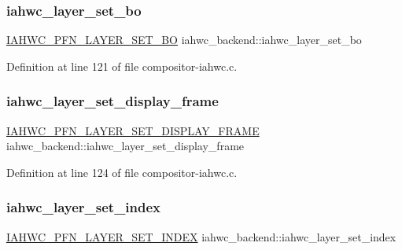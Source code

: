 \subsubsection{\texorpdfstring{iahwc\+\_\+layer\+\_\+set\+\_\+bo}{iahwc\_layer\_set\_bo}}
{\footnotesize\ttfamily \mbox{\hyperlink{iahwc_8h_a0b77b3ec5acd37ce148cf7e50edfc5cc}{I\+A\+H\+W\+C\+\_\+\+P\+F\+N\+\_\+\+L\+A\+Y\+E\+R\+\_\+\+S\+E\+T\+\_\+\+BO}} iahwc\+\_\+backend\+::iahwc\+\_\+layer\+\_\+set\+\_\+bo}



Definition at line 121 of file compositor-\/iahwc.\+c.

\mbox{\label{structiahwc__backend_a6826b4e3cd481f2e44bcfc0f4e2902b7}} 
\subsubsection{\texorpdfstring{iahwc\+\_\+layer\+\_\+set\+\_\+display\+\_\+frame}{iahwc\_layer\_set\_display\_frame}}
{\footnotesize\ttfamily \mbox{\hyperlink{iahwc_8h_a118f1525809f1ef328dd5688df041e35}{I\+A\+H\+W\+C\+\_\+\+P\+F\+N\+\_\+\+L\+A\+Y\+E\+R\+\_\+\+S\+E\+T\+\_\+\+D\+I\+S\+P\+L\+A\+Y\+\_\+\+F\+R\+A\+ME}} iahwc\+\_\+backend\+::iahwc\+\_\+layer\+\_\+set\+\_\+display\+\_\+frame}



Definition at line 124 of file compositor-\/iahwc.\+c.

\mbox{\label{structiahwc__backend_a20bd8e070d00883888c78d19739d94a4}} 
\subsubsection{\texorpdfstring{iahwc\+\_\+layer\+\_\+set\+\_\+index}{iahwc\_layer\_set\_index}}
{\footnotesize\ttfamily \mbox{\hyperlink{iahwc_8h_ad53e9282840022f0aa2169e3182f1f5b}{I\+A\+H\+W\+C\+\_\+\+P\+F\+N\+\_\+\+L\+A\+Y\+E\+R\+\_\+\+S\+E\+T\+\_\+\+I\+N\+D\+EX}} iahwc\+\_\+backend\+::iahwc\+\_\+layer\+\_\+set\+\_\+index}



